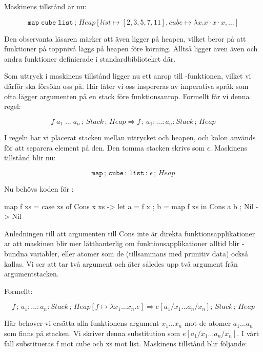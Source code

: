 \documentclass[../Core]{subfiles}
\begin{document}
Maskinens tillstånd är nu:

\[
\mathtt{map\; cube\; list}\,;\, Heap[list\mapsto[2,3,5,7,11],cube\mapsto\lambda x.x\cdot x\cdot x,\ldots]\]


Den observanta läsaren märker att även  ligger på heapen, vilket
beror på att funktioner på toppnivå läggs på heapen före körning.
Alltså ligger även även  och andra funktioner definierade
i standardbiblioteket där.

Som uttryck i maskinens tillstånd ligger nu ett anrop till
-funktionen, vilket vi därför ska försöka oss på.
Här låter vi oss inspereras av imperativa språk som ofta lägger argumenten
på en stack före funktionsanrop. Formellt får vi denna regel:

\[
f\; a_{1}\;\ldots\; a_{n}\,;\, Stack\,;\, Heap\Rightarrow f\,;\, a_{1}:\ldots:a_{n}:Stack\,;\, Heap\]


I regeln har vi placerat stacken mellan uttrycket och heapen, och kolon används
för att separera element på den. Den tomma stacken skrivs som $\epsilon$.
Maskinens tillstånd blir nu:

\[
\mathtt{map\,\mathrm{;}\, cube\,:\, list\,:\,\epsilon}\,;\, Heap\]


Nu behövs koden för :


\begin{codeEx}
map f xs = case xs of
    { Cons x xs -> let { a = f x
                       ; b = map f xs
                       } in Cons a b
    ; Nil       -> Nil
    }
\end{codeEx}

Anledningen till att argumenten till Cons inte är direkta funktionsapplikationer
ar att maskinen blir mer lätthanterlig om funktionsapplikationer alltid
blir -bundna variabler, eller atomer som de (tillsammans med primitiv data)
också kallas. Vi ser att  tar två argument och äter således upp två
argument från argumentstacken.

Formellt:

\[
f\,;\, a_{1}:\ldots:a_{n}:Stack\,;\, Heap[f\mapsto\lambda x_{1}\ldots x_{n}.e]\Rightarrow e[a{}_{1}/x_{1}\ldots a_{n}/x_{n}];\, Stack\,;\, Heap\]


Här behover vi ersätta alla funktionens argument $x_{1}\ldots x_{n}$ mot
de atomer $a_{1}\ldots a_{n}$ som finns på stacken. Vi skriver denna
substitution som $e[a{}_{1}/x_{1}\ldots a_{n}/x_{n}]$. I vårt fall
substitueras f mot cube och xs mot list. Maskinens tillstånd blir följande:
\end{document}
